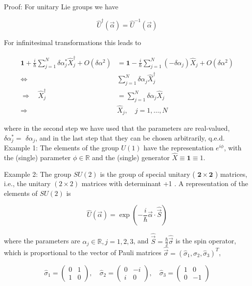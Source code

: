 \documentclass[10pt, letterpaper]{article}
\begin{document}
Proof: For unitary Lie groups we have

$$
\hat{U}^{\dagger}(\vec{\alpha})=\hat{U}^{-1}(\vec{\alpha})
$$

For infinitesimal transformations this leads to

$$
\begin{aligned}
\mathbf{1}+\frac{i}{\hbar} \sum_{j=1}^{N} \delta \alpha_{j}^{*} \hat{X}_{j}^{\dagger}+O\left(\delta \alpha^{2}\right) & =\mathbf{1}-\frac{i}{\hbar} \sum_{j=1}^{N}\left(-\delta \alpha_{j}\right) \hat{X}_{j}+O\left(\delta \alpha^{2}\right) \\
\Longleftrightarrow & \sum_{j=1}^{N} \delta \alpha_{j} \hat{X}_{j}^{\dagger} \\
\Longrightarrow \quad \hat{X}_{j}^{\dagger} & =\sum_{j=1}^{N} \delta \alpha_{j} \hat{X}_{j} \\
\Longrightarrow \quad & \hat{X}_{j}, \quad j=1, \ldots, N
\end{aligned}
$$

where in the second step we have used that the parameters are real-valued, $\delta \alpha_{j}^{*}=$ $\delta \alpha_{j}$, and in the last step that they can be chosen arbitrarily, q.e.d.\\
Example 1: The elements of the group $U(1)$ have the representation $e^{i \phi}$, with the (single) parameter $\phi \in \mathbb{R}$ and the (single) generator $\hat{X} \equiv \mathbf{1} \equiv 1$.

Example 2: The group $S U(2)$ is the group of special unitary ( $\mathbf{2} \times \mathbf{2}$ ) matrices, i.e., the unitary $(2 \times 2)$ matrices with determinant +1 . A representation of the elements of $S U(2)$ is

$$
\hat{U}(\vec{\alpha})=\exp \left(-\frac{i}{\hbar} \vec{\alpha} \cdot \hat{\vec{S}}\right)
$$

where the parameters are $\alpha_{j} \in \mathbb{R}, j=1,2,3$, and $\hat{\vec{S}}=\frac{\hbar}{2} \hat{\vec{\sigma}}$ is the spin operator, which is proportional to the vector of Pauli matrices $\hat{\vec{\sigma}}=\left(\hat{\sigma}_{1}, \hat{\sigma}_{2}, \hat{\sigma}_{3}\right)^{T}$,

$$
\hat{\sigma}_{1}=\left(\begin{array}{cc}
0 & 1 \\
1 & 0
\end{array}\right), \quad \hat{\sigma}_{2}=\left(\begin{array}{cc}
0 & -i \\
i & 0
\end{array}\right), \quad \hat{\sigma}_{3}=\left(\begin{array}{cc}
1 & 0 \\
0 & -1
\end{array}\right)
$$
\end{document}
